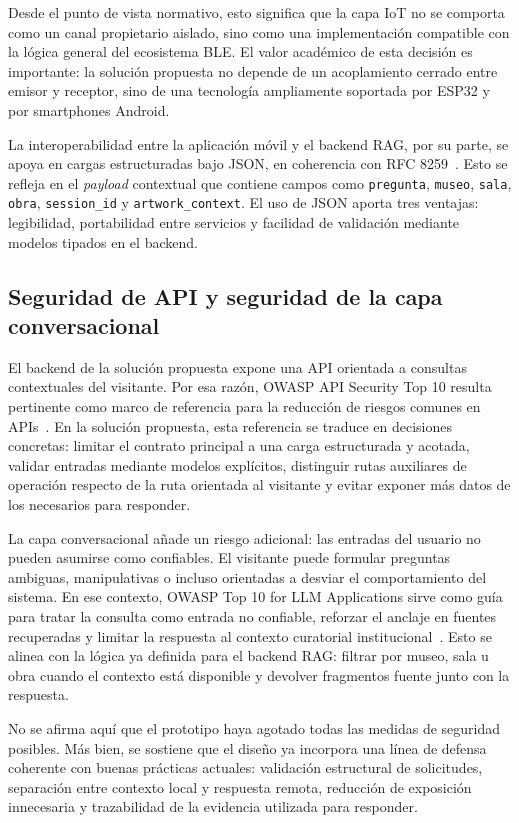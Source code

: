 Desde el punto de vista normativo, esto significa que la capa IoT no se comporta como un canal propietario aislado, sino como una implementación compatible con la lógica general del ecosistema BLE. El valor académico de esta decisión es importante: la solución propuesta no depende de un acoplamiento cerrado entre emisor y receptor, sino de una tecnología ampliamente soportada por ESP32 y por smartphones Android.

La interoperabilidad entre la aplicación móvil y el backend RAG, por su parte, se apoya en cargas estructuradas bajo JSON, en coherencia con RFC 8259~\cite{rfc8259}. Esto se refleja en el \textit{payload} contextual que contiene campos como \texttt{pregunta}, \texttt{museo}, \texttt{sala}, \texttt{obra}, \texttt{session\_id} y \texttt{artwork\_context}. El uso de JSON aporta tres ventajas: legibilidad, portabilidad entre servicios y facilidad de validación mediante modelos tipados en el backend.

\subsection{Seguridad de API y seguridad de la capa conversacional}

El backend de la solución propuesta expone una API orientada a consultas contextuales del visitante. Por esa razón, OWASP API Security Top 10 resulta pertinente como marco de referencia para la reducción de riesgos comunes en APIs~\cite{owaspapi2023}. En la solución propuesta, esta referencia se traduce en decisiones concretas: limitar el contrato principal a una carga estructurada y acotada, validar entradas mediante modelos explícitos, distinguir rutas auxiliares de operación respecto de la ruta orientada al visitante y evitar exponer más datos de los necesarios para responder.

La capa conversacional añade un riesgo adicional: las entradas del usuario no pueden asumirse como confiables. El visitante puede formular preguntas ambiguas, manipulativas o incluso orientadas a desviar el comportamiento del sistema. En ese contexto, OWASP Top 10 for LLM Applications sirve como guía para tratar la consulta como entrada no confiable, reforzar el anclaje en fuentes recuperadas y limitar la respuesta al contexto curatorial institucional~\cite{owaspllm}. Esto se alinea con la lógica ya definida para el backend RAG: filtrar por museo, sala u obra cuando el contexto está disponible y devolver fragmentos fuente junto con la respuesta.

No se afirma aquí que el prototipo haya agotado todas las medidas de seguridad posibles. Más bien, se sostiene que el diseño ya incorpora una línea de defensa coherente con buenas prácticas actuales: validación estructural de solicitudes, separación entre contexto local y respuesta remota, reducción de exposición innecesaria y trazabilidad de la evidencia utilizada para responder.

